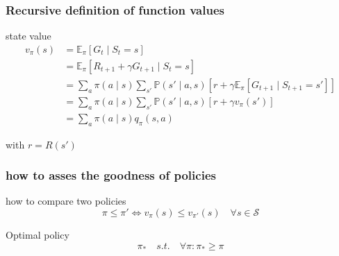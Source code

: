 \documentclass[dvipsnames,svgnames]{beamer}
\begin{document}
\begin{frame}
\frametitle{Recursive definition of function values}
\begin{block}{state value}
\begin{equation*}
\begin{split}
v_{\pi}(s) &= \mathbb{E}_{\pi}[G_t\mid S_t =s]
\\&=\mathbb{E}_{\pi}[R_{t+1}+\gamma G_{t+1}\mid S_t =s]
\\& =\sum_{a }\pi(a \mid s) \sum_{s'}\mathbb{P}(s'\mid a,s)\left[r + \gamma \mathbb{E}_{\pi}\left[G_{t+1} \mid S_{t+1}=s' \right]\right]
\\& =\sum_{a }\pi(a \mid s) \sum_{s'}\mathbb{P}(s'\mid a,s)\left[r + \gamma v_{\pi}(s') \right]
\\&=\sum_{a }\pi(a \mid s)q_{\pi}(s,a)
\end{split}
\end{equation*}
\end{block}

with $r=R(s')$
\end{frame}




\begin{frame}
\frametitle{how to asses the goodness of policies}
\begin{block}{how to compare two policies}
$$ \pi \leq \pi ' \iff  v_{\pi}(s) \leq v_{\pi'}(s) \quad \forall s \in \mathcal{S}
$$
\end{block}

\pause 

\begin{block}{Optimal policy}
$$ \pi_{*} \quad s.t. \quad \forall \pi : \pi_{*}\geq \pi $$
\end{block}
\end{frame}

\end{document}
